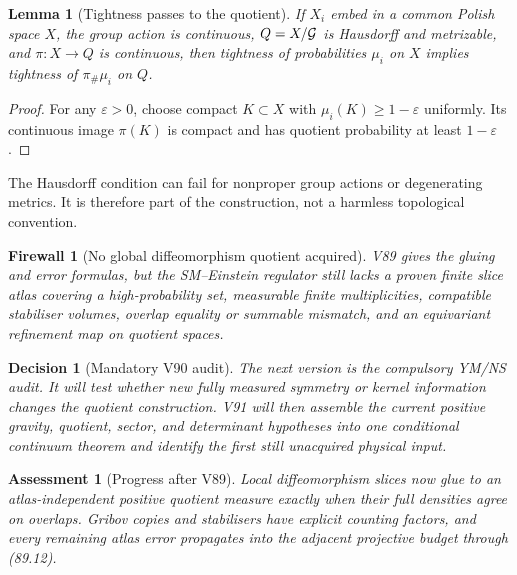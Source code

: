 \documentclass[11pt]{article}
\newtheorem{lemma}[theorem]{Lemma}
\newtheorem{assessment}[theorem]{Assessment}
\newtheorem{firewall}[theorem]{Firewall}
\newtheorem{decision}[theorem]{Decision}
\begin{document}
\begin{lemma}[Tightness passes to the quotient]
\label{lem:v11v89-tight}
If \(X_i\) embed in a common Polish space \(X\), the group action is
continuous, \(Q=X/{\cal G}\) is Hausdorff and metrizable, and
\(\pi:X\to Q\) is continuous, then tightness of probabilities
\(\mu_i\) on \(X\) implies tightness of \(\pi_\#\mu_i\) on \(Q\).
\end{lemma}

\begin{proof}
For any \(\varepsilon>0\), choose compact \(K\subset X\) with
\(\mu_i(K)\ge1-\varepsilon\) uniformly.  Its continuous image
\(\pi(K)\) is compact and has quotient probability at least
\(1-\varepsilon\).
\end{proof}

The Hausdorff condition can fail for nonproper group actions or
degenerating metrics.  It is therefore part of the construction, not
a harmless topological convention.

\begin{firewall}[No global diffeomorphism quotient acquired]
\label{fire:v11v89-boundary}
V89 gives the gluing and error formulas, but the SM--Einstein
regulator still lacks a proven finite slice atlas covering a
high-probability set, measurable finite multiplicities, compatible
stabiliser volumes, overlap equality or summable mismatch, and an
equivariant refinement map on quotient spaces.
\end{firewall}

\begin{decision}[Mandatory V90 audit]
\label{dec:v11v89-next}
The next version is the compulsory YM/NS audit.  It will test whether
new fully measured symmetry or kernel information changes the
quotient construction.  V91 will then assemble the current positive
gravity, quotient, sector, and determinant hypotheses into one
conditional continuum theorem and identify the first still
unacquired physical input.
\end{decision}

\begin{assessment}[Progress after V89]
\label{ass:v11v89-status}
Local diffeomorphism slices now glue to an atlas-independent positive
quotient measure exactly when their full densities agree on overlaps.
Gribov copies and stabilisers have explicit counting factors, and
every remaining atlas error propagates into the adjacent projective
budget through (89.12).
\end{assessment}
\end{document}
